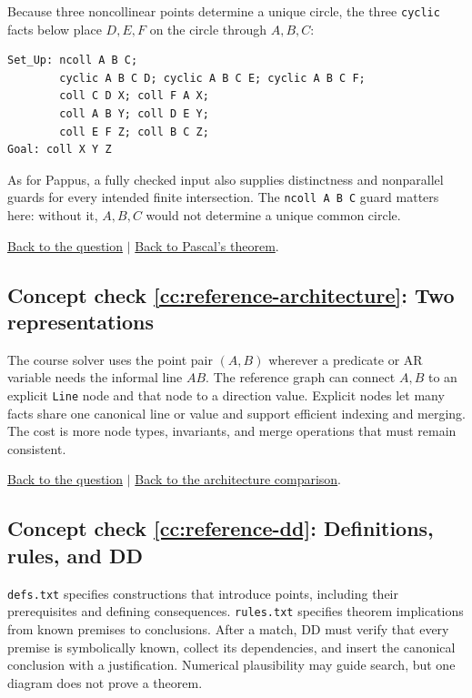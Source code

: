 \documentclass[reqno]{amsart}
\DeclareMathOperator{\1}{\textbf{1}}
\begin{document}
Because three noncollinear points determine a unique circle, the three
\verb|cyclic| facts below place $D,E,F$ on the circle through $A,B,C$:
\begin{lstlisting}
Set_Up: ncoll A B C;
        cyclic A B C D; cyclic A B C E; cyclic A B C F;
        coll C D X; coll F A X;
        coll A B Y; coll D E Y;
        coll E F Z; coll B C Z;
Goal: coll X Y Z
\end{lstlisting}
As for Pappus, a fully checked input also supplies distinctness and
nonparallel guards for every intended finite intersection. The
\verb|ncoll A B C| guard matters here: without it, $A,B,C$ would not determine
a unique common circle.

\noindent\hyperlink{ccq:formalize-pascal}{Back to the question}
$\mid$
\hyperref[sec: Pascal]{Back to Pascal's theorem}.

\hypertarget{cca:reference-architecture}{}
\subsection*{Concept check \ref{cc:reference-architecture}: Two representations}

The course solver uses the point pair $(A,B)$ wherever a predicate or AR
variable needs the informal line $AB$. The reference graph can connect $A,B$
to an explicit \texttt{Line} node and that node to a direction value. Explicit
nodes let many facts share one canonical line or value and support efficient
indexing and merging. The cost is more node types, invariants, and merge
operations that must remain consistent.

\noindent\hyperlink{ccq:reference-architecture}{Back to the question}
$\mid$
\hyperref[sec: architecture comparison]{Back to the architecture comparison}.

\hypertarget{cca:reference-dd}{}
\subsection*{Concept check \ref{cc:reference-dd}: Definitions, rules, and DD}

\verb|defs.txt| specifies constructions that introduce points, including
their prerequisites and defining consequences. \verb|rules.txt| specifies
theorem implications from known premises to conclusions. After a match, DD
must verify that every premise is symbolically known, collect its dependencies,
and insert the canonical conclusion with a justification. Numerical
plausibility may guide search, but one diagram does not prove a theorem.
\end{document}
